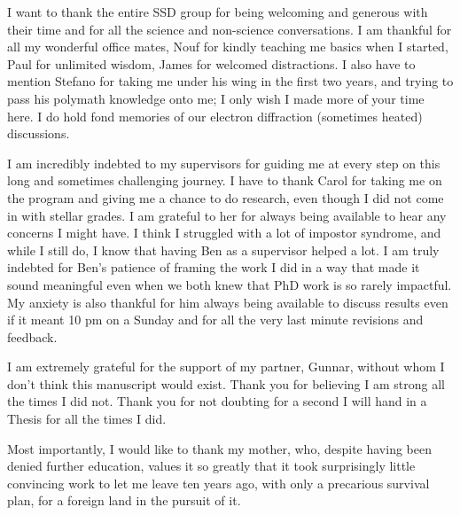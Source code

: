 \documentclass[
11pt, %
english, %
onehalfspacing, %
headsepline, %
chapterinoneline, %
]{MastersDoctoralThesis} %
\begin{document}
\begin{acknowledgements}

\vspace{2cm}
I want to thank the entire SSD group for being welcoming and generous with their time and for all the science and non-science conversations. I am thankful for all my wonderful office mates, Nouf for kindly teaching me basics when I started, Paul for unlimited wisdom, James for welcomed distractions. I also have to mention Stefano for taking me under his wing in the first two years, and trying to pass his polymath knowledge onto me; I only wish I made more of your time here. I do hold fond memories of our electron diffraction (sometimes heated) discussions.

I am incredibly indebted to my supervisors for guiding me at every step on this long and sometimes challenging journey. I have to thank Carol for taking me on the program and giving me a chance to do research, even though I did not come in with stellar grades. I am grateful to her for always being available to hear any concerns I might have. I think I struggled with a lot of impostor syndrome, and while I still do, I know that having Ben as a supervisor helped a lot. I am truly indebted for Ben's patience of framing the work I did in a way that made it sound meaningful even when we both knew that PhD work is so rarely impactful. My anxiety is also thankful for him always being available to discuss results even if it meant 10 pm on a Sunday and for all the very last minute revisions and feedback. 

I am extremely grateful for the support of my partner, Gunnar, without whom I don't think this manuscript would exist. Thank you for believing I am strong all the times I did not. Thank you for not doubting for a second I will hand in a Thesis for all the times I did.  


Most importantly, I would like to thank my mother, who, despite having been denied further education, values it so greatly that it took surprisingly little convincing work to let me leave ten years ago, with only a precarious survival plan, for a foreign land in the pursuit of it.   


\end{acknowledgements}
\end{document}
